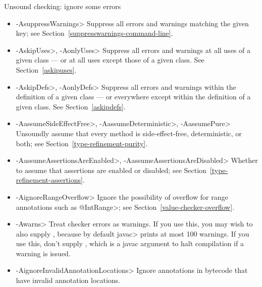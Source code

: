 Unsound checking: ignore some errors
\begin{itemize}
\item \<-AsuppressWarnings>
  Suppress all errors and warnings matching the given key; see
  Section~\ref{suppresswarnings-command-line}.
\item \<-AskipUses>, \<-AonlyUses>
  Suppress all errors and warnings at all uses of a given class --- or at all
  uses except those of a given class.  See Section~\ref{askipuses}.
\item \<-AskipDefs>, \<-AonlyDefs>
  Suppress all errors and warnings within the definition of a given class
  --- or everywhere except within the definition of a given class.  See
  Section~\ref{askipdefs}.
\item \<-AassumeSideEffectFree>, \<-AassumeDeterministic>, \<-AassumePure>
  Unsoundly assume that every method is side-effect-free, deterministic, or
  both; see
  Section~\ref{type-refinement-purity}.
\item \<-AassumeAssertionsAreEnabled>, \<-AassumeAssertionsAreDisabled>
  Whether to assume that assertions are enabled or disabled; see Section~\ref{type-refinement-assertions}.
\item \<-AignoreRangeOverflow>
  Ignore the possibility of overflow for range annotations such as
  \<@IntRange>; see Section~\ref{value-checker-overflow}.
\item \<-Awarns>
  Treat checker errors as warnings.  If you use this, you may wish to also
  supply , because by default \<javac> prints at
  most 100 warnings.  If you use this, don't supply ,
  which is a javac argument to halt compilation if a warning is issued.
\item \<-AignoreInvalidAnnotationLocations>
  Ignore annotations in bytecode that have invalid annotation locations.
\end{itemize}

